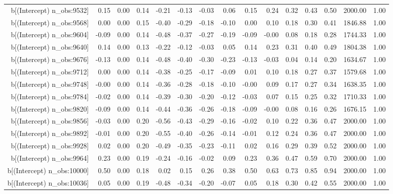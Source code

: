 \begin{table}[ht]
\begin{tabular}{rrrrrrrrrrrrrrr}
  b[(Intercept) n\_obs:9532] & 0.15 & 0.00 & 0.14 & -0.21 & -0.13 & -0.03 & 0.06 & 0.15 & 0.24 & 0.32 & 0.43 & 0.50 & 2000.00 & 1.00 \\ 
  b[(Intercept) n\_obs:9568] & 0.00 & 0.00 & 0.15 & -0.40 & -0.29 & -0.18 & -0.10 & 0.00 & 0.10 & 0.18 & 0.30 & 0.41 & 1846.88 & 1.00 \\ 
  b[(Intercept) n\_obs:9604] & -0.09 & 0.00 & 0.14 & -0.48 & -0.37 & -0.27 & -0.19 & -0.09 & -0.00 & 0.08 & 0.18 & 0.28 & 1744.33 & 1.00 \\ 
  b[(Intercept) n\_obs:9640] & 0.14 & 0.00 & 0.13 & -0.22 & -0.12 & -0.03 & 0.05 & 0.14 & 0.23 & 0.31 & 0.40 & 0.49 & 1804.38 & 1.00 \\ 
  b[(Intercept) n\_obs:9676] & -0.13 & 0.00 & 0.14 & -0.48 & -0.40 & -0.30 & -0.23 & -0.13 & -0.03 & 0.04 & 0.14 & 0.20 & 1634.67 & 1.00 \\ 
  b[(Intercept) n\_obs:9712] & 0.00 & 0.00 & 0.14 & -0.38 & -0.25 & -0.17 & -0.09 & 0.01 & 0.10 & 0.18 & 0.27 & 0.37 & 1579.68 & 1.00 \\ 
  b[(Intercept) n\_obs:9748] & -0.00 & 0.00 & 0.14 & -0.36 & -0.28 & -0.18 & -0.10 & -0.00 & 0.09 & 0.17 & 0.27 & 0.34 & 1638.35 & 1.00 \\ 
  b[(Intercept) n\_obs:9784] & -0.02 & 0.00 & 0.14 & -0.39 & -0.30 & -0.20 & -0.12 & -0.03 & 0.07 & 0.15 & 0.25 & 0.32 & 1710.33 & 1.00 \\ 
  b[(Intercept) n\_obs:9820] & -0.09 & 0.00 & 0.14 & -0.44 & -0.36 & -0.26 & -0.18 & -0.09 & -0.00 & 0.08 & 0.16 & 0.26 & 1676.15 & 1.00 \\ 
  b[(Intercept) n\_obs:9856] & -0.03 & 0.00 & 0.20 & -0.56 & -0.43 & -0.29 & -0.16 & -0.02 & 0.10 & 0.22 & 0.36 & 0.47 & 2000.00 & 1.00 \\ 
  b[(Intercept) n\_obs:9892] & -0.01 & 0.00 & 0.20 & -0.55 & -0.40 & -0.26 & -0.14 & -0.01 & 0.12 & 0.24 & 0.36 & 0.47 & 2000.00 & 1.00 \\ 
  b[(Intercept) n\_obs:9928] & 0.02 & 0.00 & 0.20 & -0.49 & -0.35 & -0.23 & -0.11 & 0.02 & 0.16 & 0.29 & 0.39 & 0.52 & 2000.00 & 1.00 \\ 
  b[(Intercept) n\_obs:9964] & 0.23 & 0.00 & 0.19 & -0.24 & -0.16 & -0.02 & 0.09 & 0.23 & 0.36 & 0.47 & 0.59 & 0.70 & 2000.00 & 1.00 \\ 
  b[(Intercept) n\_obs:10000] & 0.50 & 0.00 & 0.18 & 0.02 & 0.15 & 0.26 & 0.38 & 0.50 & 0.63 & 0.73 & 0.85 & 0.94 & 2000.00 & 1.00 \\ 
  b[(Intercept) n\_obs:10036] & 0.05 & 0.00 & 0.19 & -0.48 & -0.34 & -0.20 & -0.07 & 0.05 & 0.18 & 0.30 & 0.42 & 0.55 & 2000.00 & 1.00 \\ 

\end{tabular}
\end{table}
